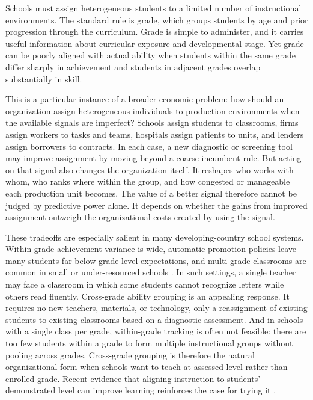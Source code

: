 \documentclass[11pt]{article}
\begin{document}
Schools must assign heterogeneous students to a limited number of instructional environments. The standard rule is grade, which groups students by age and prior progression through the curriculum. Grade is simple to administer, and it carries useful information about curricular exposure and developmental stage. Yet grade can be poorly aligned with actual ability when students within the same grade differ sharply in achievement and students in adjacent grades overlap substantially in skill.

This is a particular instance of a broader economic problem: how should an organization assign heterogeneous individuals to production environments when the available signals are imperfect? Schools assign students to classrooms, firms assign workers to tasks and teams, hospitals assign patients to units, and lenders assign borrowers to contracts. In each case, a new diagnostic or screening tool may improve assignment by moving beyond a coarse incumbent rule. But acting on that signal also changes the organization itself. It reshapes who works with whom, who ranks where within the group, and how congested or manageable each production unit becomes. The value of a better signal therefore cannot be judged by predictive power alone. It depends on whether the gains from improved assignment outweigh the organizational costs created by using the signal.

These tradeoffs are especially salient in many developing-country school systems. Within-grade achievement variance is wide, automatic promotion policies leave many students far below grade-level expectations, and multi-grade classrooms are common in small or under-resourced schools \citep{banerjee/cole/duflo/linden:2007,muralidharan2019disrupting}. In such settings, a single teacher may face a classroom in which some students cannot recognize letters while others read fluently. Cross-grade ability grouping is an appealing response. It requires no new teachers, materials, or technology, only a reassignment of existing students to existing classrooms based on a diagnostic assessment. And in schools with a single class per grade, within-grade tracking is often not feasible: there are too few students within a grade to form multiple instructional groups without pooling across grades. Cross-grade grouping is therefore the natural organizational form when schools want to teach at assessed level rather than enrolled grade. Recent evidence that aligning instruction to students' demonstrated level can improve learning reinforces the case for trying it \citep{duflo2020experimental, duflo2011peer}.
\end{document}
